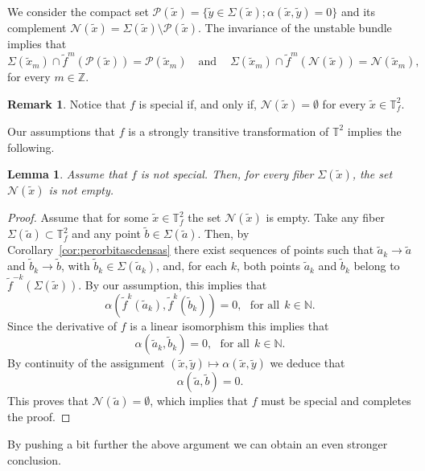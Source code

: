 \documentclass[a4paper,11pt,reqno]{amsart}
\newcommand{\Z}{{\mathbb Z}}
\newcommand{\N}{{\mathbb N}}
\newcommand{\TT}{{\mathbb{T}^2}}
\newcommand{\TTf}{{\mathbb{T}_f^2}}
\newcommand{\cN}{{\mathcal N}}
\newcommand{\cP}{{\mathcal P}}
\newcommand{\tix}{\tilde{x}}
\newcommand{\ta}{\tilde{a}}
\newcommand{\tb}{\tilde{b}}
\newcommand{\tif}{\tilde{f}}
\newtheorem{lemma}[theorem]{Lemma}
\theoremstyle{definition}
\newtheorem{remark}{Remark}
\begin{document}
We consider the compact set $\cP(\tix)=\{\tilde{y}\in\Sigma(\tix);\alpha(\tix,\tilde{y})=0\}$ and its complement $\cN(\tix)=\Sigma(\tix)\setminus\cP(\tix)$. The invariance of the unstable bundle implies that  
\begin{equation}
	\label{eq:P-N-invartiant}
\Sigma(\tix_m)\cap\tilde{f}^m(\cP(\tix))=\cP(\tix_m) \:\:\:\textrm{ and }\:\:\:\:\Sigma(\tix_m)\cap\tilde{f}^m(\cN(\tix))=\cN(\tix_m),
\end{equation}
for every $m\in\Z$.
\begin{remark}
    Notice that $f$ is special if, and only if, $\cN(\tix)=\emptyset$ for every $\tix\in\TTf$.
\end{remark}


Our assumptions that $f$ is a {strongly transitive} transformation of $\TT$ implies the following.  

\begin{lemma}
	\label{l.especialcontagia}
Assume that $f$ is not special. Then, for every fiber $\Sigma(\tix)$, the set $\cN(\tix)$ is not empty.
\end{lemma}
\begin{proof}

Assume that for some $\tix\in\TTf$ the set $\cN(\tix)$ is empty. Take any fiber $\Sigma(\tilde{a})\subset\TTf$ and any point $\tilde{b}\in\Sigma(\tilde{a})$. Then, by Corollary~\ref{cor:perorbitascdensas} there exist sequences of points such that $\tilde{a}_k\to \tilde{a}$ and $\tilde{b}_k\to \tilde{b}$, with $\tb_k\in\Sigma(\ta_k)$, and, for each $k$, both points $\tilde{a}_k$ and $\tilde{b}_k$ belong to $\tif^{-k}(\Sigma(\tix))$. By our assumption, this implies that
\[
\alpha(\tif^k(\tilde{a}_k),\tif^k(\tilde{b}_k))=0,\:\:\:\textrm{for all}\:\:k\in\N.
\]
Since the derivative of $f$ is a linear isomorphism this implies that 
\[
\alpha(\tilde{a}_k,\tilde{b}_k)=0,\:\:\:\textrm{for all}\:\:k\in\N.
\]
By continuity of the assignment $(\tix,\tilde{y})\mapsto\alpha(\tix,\tilde{y})$ we deduce that 
\[
\alpha(\tilde{a},\tilde{b})=0.
\]
This proves that $\cN(\tilde{a})=\emptyset$, which implies that $f$ must be special and completes the proof.
\end{proof}

By pushing a bit further the above argument we can obtain an even stronger conclusion. 
\end{document}
